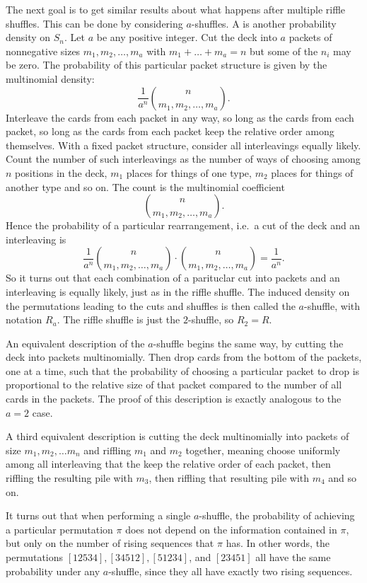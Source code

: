 \documentclass[12pt]{article}
\begin{document}
The next goal is to get similar results about what happens after
multiple riffle shuffles.  This can be done by considering \( a \)-shuffles.
A  is another probability density on \( S_n \).
Let \( a \) be any positive integer.  Cut the deck into \( a \) packets
of nonnegative sizes \( m_1, m_2, \dots, m_a \) with \( m_1 + \dots + m_a
= n \) but some of the \( n_i \) may be zero.  The probability of this
particular packet structure is given by the multinomial density:
\[
    \frac{1}{a^n} \binom{n}{m_1, m_2, \dots, m_a}.
\] Interleave the cards from each packet in any way, so long as the
cards from each packet, so long as the cards from each packet keep the
relative order among themselves.  With a fixed packet structure,
consider all interleavings equally likely.  Count the number of such
interleavings as the number of ways of choosing among \( n \) positions
in the deck, \( m_1 \) places for things of one type, \( m_2 \) places
for things of another type and so on.  The count is the multinomial
coefficient
\[
    \binom{n}{m_1, m_2, \dots, m_a}.
\] Hence the probability of a particular rearrangement, i.e.\ a cut of
the deck and an interleaving is
\[
    \frac{1}{a^n} \binom{n}{m_1, m_2, \dots, m_a} \cdot \binom{n}{m_1, m_2,
    \dots, m_a} = \frac{1}{a^n}.
\] So it turns out that each combination of a parituclar cut into
packets and an interleaving is equally likely, just as in the riffle
shuffle.  The induced density on the permutations leading to the cuts
and shuffles is then called the \( a \)-shuffle,%
with notation \( R_a \).  The riffle shuffle is just the \( 2 \)-shuffle,
so \( R_2 = R \).

An equivalent description of the \( a \)-shuffle begins the same way, by
cutting the deck into packets multinomially.  Then drop cards from the
bottom of the packets, one at a time, such that the probability of
choosing a particular packet to drop is proportional to the relative
size of that packet compared to the number of all cards in the packets.
The proof of this description is exactly analogous to the \( a = 2 \)
case.

A third equivalent description is cutting the deck multinomially into
packets of size \( m_1, m_2, \dots m_n \) and riffling \( m_1 \) and \(
m_2 \) together, meaning choose uniformly among all interleaving that
the keep the relative order of each packet, then riffling the resulting
pile with \( m_3 \), then riffling that resulting pile with \( m_4 \)
and so on.

It turns out that when performing a single \( a \)-shuffle, the
probability of achieving a particular permutation \( \pi \) does not
depend on the information contained in \( \pi \), but only on the number
of rising sequences that \( \pi \) has.  In other words, the
permutations \( [12534], [34512], [51234] \), and \( [23451] \) all have
the same probability under any \( a \)-shuffle, since they all have
exactly two rising sequences.
\end{document}
